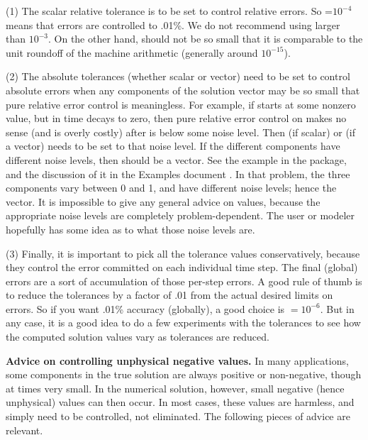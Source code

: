 (1) The scalar relative tolerance  is to be set to control relative
errors.  So =$10^{-4}$ means that errors are controlled to .01\%.  We
do not recommend using  larger than $10^{-3}$.  On the other hand,
 should not be so small that it is comparable to the unit roundoff
of the machine arithmetic (generally around $10^{-15}$).

(2) The absolute tolerances  (whether scalar or vector) need to
be set to control absolute errors when any components of the solution
vector  may be so small that pure relative error control is
meaningless.  For example, if  starts at some nonzero value, but in time
decays to zero, then pure relative error control on  makes no sense
(and is overly costly) after  is below some noise level.  Then
 (if scalar) or  (if a vector) needs to be set to that
noise level.  If the different components have different noise levels,
then  should be a vector.  See the example  in the
{\ida} package, and the discussion of it in the {\ida} Examples document
\cite{ida_ex}.
In that problem, the three components vary between 0 and 1, and have
different noise levels; hence the  vector.  It is impossible to
give any general advice on  values, because the appropriate noise
levels are completely problem-dependent.  The user or modeler hopefully has
some idea as to what those noise levels are.

(3) Finally, it is important to pick all the tolerance values conservatively,
because they control the error committed on each individual time step.
The final (global) errors are a sort of accumulation of those
per-step errors.  A good rule of thumb is to reduce the tolerances by a
factor of .01 from the actual desired limits on errors.  So if you
want .01\% accuracy (globally), a good choice is $=10^{-6}$.
But in any case, it is a good idea to do a few experiments with
the tolerances to see how the computed solution values vary as
tolerances are reduced.

\vspace{0.1in}
{\bf Advice on controlling unphysical negative values.}
In many applications, some components in the true solution are always
positive or non-negative, though at times very small.  In the numerical
solution, however, small negative (hence unphysical) values can then
occur.  In most cases, these values are harmless, and simply need to
be controlled, not eliminated. The following pieces of advice are relevant.

